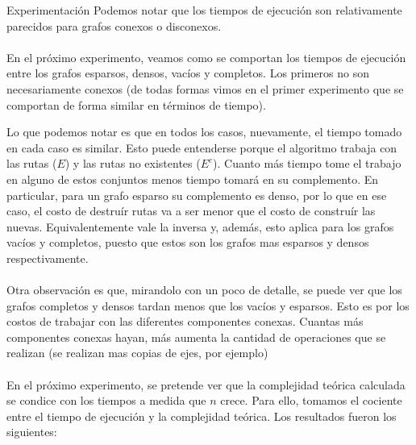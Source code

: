 \documentclass[a4paper]{article}
\begin{document}
\begin{subsection}{Experimentaci\'{o}n}
Podemos notar que los tiempos de ejecuci\'{o}n son relativamente parecidos para grafos conexos o disconexos. \\ \\
En el pr\'{o}ximo experimento, veamos como se comportan los tiempos de ejecuci\'{o}n entre los grafos esparsos, densos, vac\'{i}os y completos. Los primeros no son necesariamente conexos (de todas formas vimos en el primer experimento que se comportan de forma similar en t\'{e}rminos de tiempo).

\begin{figure}[!h]
\centering
{}
\end{figure}

Lo que podemos notar es que en todos los casos, nuevamente, el tiempo tomado en cada caso es similar. Esto puede entenderse porque el algoritmo trabaja con las rutas ($E$) y las rutas no existentes ($E^c$). Cuanto m\'{a}s tiempo tome el trabajo en alguno de estos conjuntos menos tiempo tomar\'{a} en su complemento. En particular, para un grafo esparso su complemento es denso, por lo que en ese caso, el costo de destru\'{i}r rutas va a ser menor que el costo de constru\'{i}r las nuevas. Equivalentemente vale la inversa y, adem\'{a}s, esto aplica para los grafos vac\'{i}os y completos, puesto que estos son los grafos mas esparsos y densos respectivamente. \\ \\
Otra observaci\'{o}n es que, mirandolo con un poco de detalle, se puede ver que los grafos completos y densos tardan menos que los vac\'{i}os y esparsos. Esto es por los costos de trabajar con las diferentes componentes conexas. Cuantas m\'{a}s componentes conexas hayan,  m\'{a}s aumenta la cantidad de operaciones que se realizan (se realizan mas copias de ejes, por ejemplo) \\ \\ 
En el pr\'{o}ximo experimento, se pretende ver que la complejidad te\'{o}rica calculada se condice con los tiempos a medida que $n$ crece. Para ello, tomamos el cociente entre el tiempo de ejecuci\'{o}n y la complejidad te\'{o}rica. Los resultados fueron los siguientes:


\end{subsection}
\end{document}

